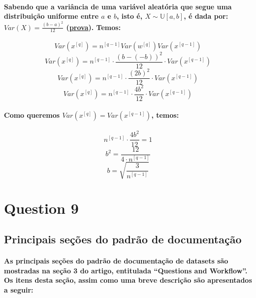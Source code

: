 \documentclass[a4paper]{article}    %
\begin{document}
\paragraph{Sabendo que a variância de uma variável aleatória que segue uma distribuição uniforme entre $a$ e $b$, isto é, $X \sim \mathbb{U}[a,b]$, é dada por: $Var(X) = \frac{(b-a)^2}{12}$ (\href{https://proofwiki.org/wiki/Variance_of_Continuous_Uniform_Distribution}{prova}). Temos:}
\[Var(x^{[q]}) = n^{[q-1]} Var(w^{[q]})Var(x^{[q-1]})\]
\[Var(x^{[q]}) = n^{[q-1]} \cdot \frac{(b-(-b))^2}{12} \cdot Var(x^{[q-1]})\]
\[Var(x^{[q]}) = n^{[q-1]} \cdot \frac{(2b)^2}{12} \cdot Var(x^{[q-1]})\]
\[Var(x^{[q]}) = n^{[q-1]} \cdot \frac{4b^2}{12} \cdot Var(x^{[q-1]})\]

\paragraph{Como queremos $Var(x^{[q]}) = Var(x^{[q-1]})$, temos:}
\[n^{[q-1]} \cdot \frac{4b^2}{12} = 1\]
\[b^2 = \frac{12}{4 \cdot n^{[q-1]}}\]
\[\boxed{b = \sqrt{\frac{3}{n^{[q-1]}}}}\]

\newpage
\setcounter{section}{9}
\setcounter{subsection}{0}
\section*{Question 9}

\subsection{Principais seções do padrão de documentação}
\paragraph{As principais seções do padrão de documentação de datasets são mostradas na seção 3 do artigo, entitulada ``Questions and Workflow''. Os itens desta seção, assim como uma breve descrição são apresentados a seguir:}
\end{document}
